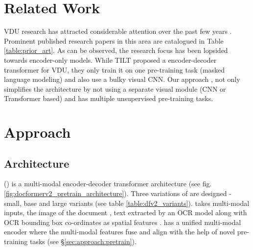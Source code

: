 \documentclass[10pt,twocolumn,letterpaper]{article}
\begin{document}
\section{Related Work}
\label{sec:related_work}
VDU research has attracted considerable attention over the past few years \cite{Wang2022ABF,xu2020layoutlm,xu2020layoutlmv2,appalaraju2021docformer,Li2021SelfDoc,powalski2021going,Li2021MarkupLM,huang2022layoutlmv3,hong2020bros,Gu2022UnifiedUDOC,Gu2022XYLayoutLM,Lee2022FormNet,Wang2022LiLT,Chen2022XDoc,Tang2022UnifyingUDOP,Borchmann2021DUE,peng2022ernie,li2021structurallm}. Prominent published research papers in this area are catalogued in Table \ref{table:prior_art}. As can be observed, the research focus has been lopsided towards encoder-only models. While TILT \cite{powalski2021going} proposed a encoder-decoder transformer for VDU, they only train it on one pre-training task (masked language modeling) and also use a bulky visual CNN. Our approach \papertitle, not only simplifies the architecture by not using a separate visual module (CNN or Transformer based) and has multiple unsupervised pre-training tasks. 














\section{Approach}
\label{sec:approach}


\subsection{Architecture}
\label{sec:approach:arch}

\papertitle (\papertitleshort) is a multi-modal encoder-decoder transformer architecture (see fig. \ref{fig:docformerv2_pretrain_architecture}). Three variations of \papertitleshort are designed - small, base and large variants (see table \ref{table:dfv2_variants}).
\papertitleshort takes multi-modal inputs, the image of the document , text  extracted by an OCR model along with OCR bounding box co-ordinates as spatial features . \papertitleshort has a unified multi-modal encoder where the multi-modal features fuse and align with the help of novel pre-training tasks (see \S \ref{sec:approach:pretrain}). 
\end{document}
